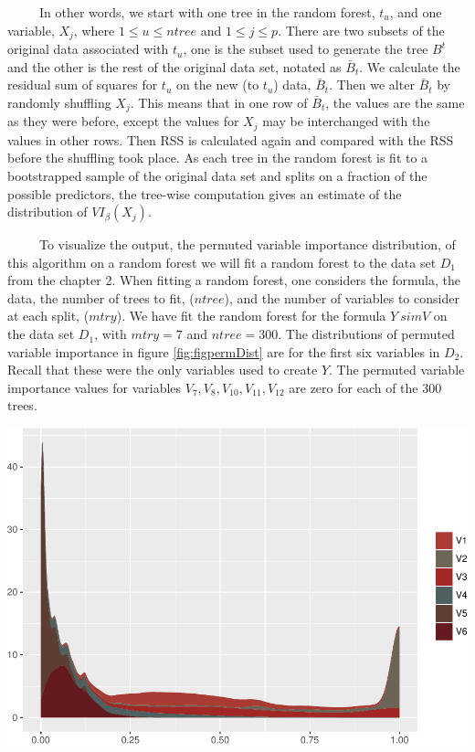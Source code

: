 \documentclass[12pt,twoside]{reedthesis}
\let\origfigure\figure
\let\endorigfigure\endfigure
\renewenvironment{figure}[1][2] {
    \expandafter\origfigure\expandafter[H]
} {
    \endorigfigure
}
\begin{document}
  ~~~~~In other words, we start with one tree in the random forest,
  \(t_u\), and one variable, \(X_j\), where \(1 \leq u \leq ntree\) and
  \(1 \leq j \leq p\). There are two subsets of the original data
  associated with \(t_u\), one is the subset used to generate the tree
  \({B}^t\) and the other is the rest of the original data set, notated as
  \(\bar{B}_t\). We calculate the residual sum of squares for \(t_u\) on
  the new (to \(t_u\)) data, \(\bar{B}_t\). Then we alter \(\bar{B}_t\) by
  randomly shuffling \(X_j\). This means that in one row of \(\bar{B}_t\),
  the values are the same as they were before, except the values for
  \(X_j\) may be interchanged with the values in other rows. Then RSS is
  calculated again and compared with the RSS before the shuffling took
  place. As each tree in the random forest is fit to a bootstrapped sample
  of the original data set and splits on a fraction of the possible
  predictors, the tree-wise computation gives an estimate of the
  distribution of \(VI_{\beta}(X_j)\).
  
  ~~~~~To visualize the output, the permuted variable importance
  distribution, of this algorithm on a random forest we will fit a random
  forest to the data set \(D_1\) from the chapter 2. When fitting a random
  forest, one considers the formula, the data, the number of trees to fit,
  (\(ntree\)), and the number of variables to consider at each split,
  (\(mtry\)). We have fit the random forest for the formula \(Y \ sim V\)
  on the data set \(D_1\), with \(mtry = 7\) and \(ntree = 300\). The
  distributions of permuted variable importance in figure
  \ref{fig:figpermDist} are for the first six variables in \(D_2\). Recall
  that these were the only variables used to create \(Y\). The permuted
  variable importance values for variables
  \(V_7,V_8,V_{10},V_{11},V_{12}\) are zero for each of the 300 trees.
  
  \begin{figure}[htbp]
  \centering
  \includegraphics{Thesis_files/figure-latex/unnamed-chunk-25-1.pdf}
  \caption{\label{fig:unnamed-chunk-25}\label{fig:figpermDist}The distribution
  of permuted variable importance for the first six variables in D2.}
  \end{figure}
  
\end{document}
